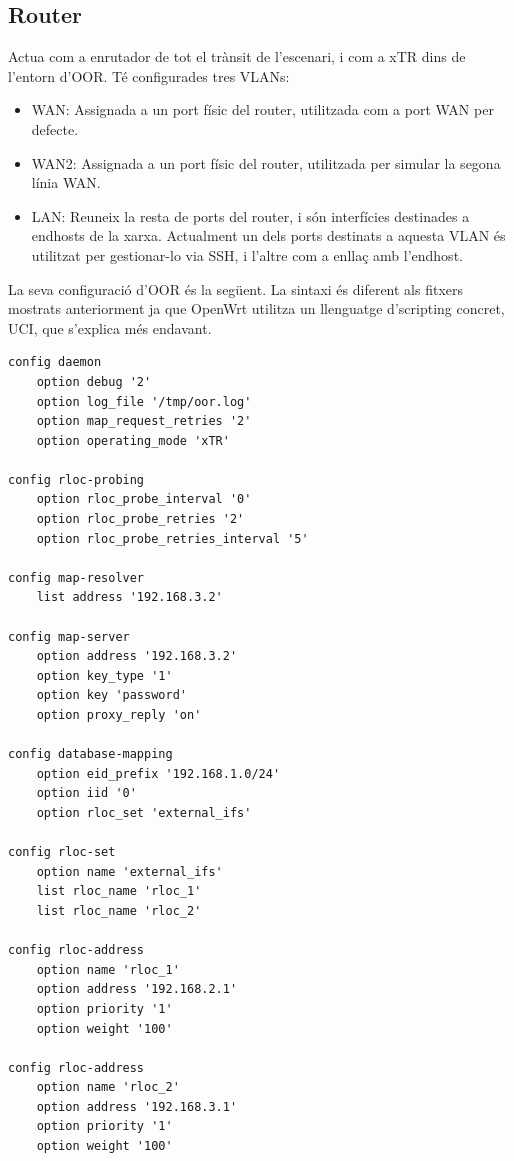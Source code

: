 \documentclass[11pt]{article}
\begin{document}
\subsection{Router}
Actua com a enrutador de tot el trànsit de l’escenari, i com a xTR dins de l’entorn d’OOR. Té configurades tres VLANs:
\begin{itemize}
\item WAN: Assignada a un port físic del router, utilitzada com a port WAN per defecte.
\item WAN2: Assignada a un port físic del router, utilitzada per simular la segona línia WAN.
\item LAN: Reuneix la resta de ports del router, i són interfícies destinades a endhosts de la xarxa. Actualment un dels ports destinats a aquesta VLAN és utilitzat per gestionar-lo via SSH, i l’altre com a enllaç amb l’endhost.
\end{itemize}
La seva configuració d’OOR és la següent. La sintaxi és diferent als fitxers mostrats anteriorment ja que OpenWrt utilitza un llenguatge d’scripting concret, UCI, que s’explica més endavant.\\
\lstset{language=sh, caption=Configuració d'OOR de l'xTR}
\begin{lstlisting}[frame=single]
config daemon
    option debug '2'
    option log_file '/tmp/oor.log'
    option map_request_retries '2'
    option operating_mode 'xTR'

config rloc-probing
    option rloc_probe_interval '0'
    option rloc_probe_retries '2'
    option rloc_probe_retries_interval '5'

config map-resolver
    list address '192.168.3.2'

config map-server
    option address '192.168.3.2'
    option key_type '1'
    option key 'password'
    option proxy_reply 'on'

config database-mapping
    option eid_prefix '192.168.1.0/24'
    option iid '0'
    option rloc_set 'external_ifs'

config rloc-set
    option name 'external_ifs'
    list rloc_name 'rloc_1'
    list rloc_name 'rloc_2'

config rloc-address
    option name 'rloc_1'
    option address '192.168.2.1'
    option priority '1'
    option weight '100'

config rloc-address
    option name 'rloc_2'
    option address '192.168.3.1'
    option priority '1'
    option weight '100'
\end{lstlisting}
\end{document}
